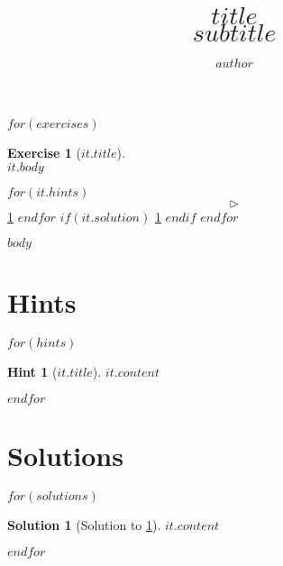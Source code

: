 \documentclass[a4,10pt]{article}
\title{{\bfseries \Huge{$title$}} \\ $subtitle$}
\author{$author$}
\newtheorem{exercise}{Exercise}
\newtheorem{hint}{Hint}
\newtheorem{solution}{Solution}
\begin{document}
\maketitle

$for(exercises)$
\begin{exercise}[{$it.title$}]
    \label{$it.id$}
    ~\\
    $it.body$
\end{exercise}
$for(it.hints)$
$$\triangleright$$ \cref{$it.id$}
$endfor$
$if(it.solution)$
\hfill
\cref{$it.id$:solution} \qedsymbol
$endif$
$endfor$

\clearpage 

$body$

\appendix

\section{Hints}

$for(hints)$
\label{$it.id$:hints}
\begin{hint}[{$it.title$}]
    \label{$it.id$}
    $it.content$
\end{hint}
$endfor$

\clearpage
\section{Solutions}

$for(solutions)$
\begin{solution}[Solution to \cref{$it.id$}]
    \label{$it.id$:solution}
    $it.content$
\end{solution}
$endfor$
\end{document}
